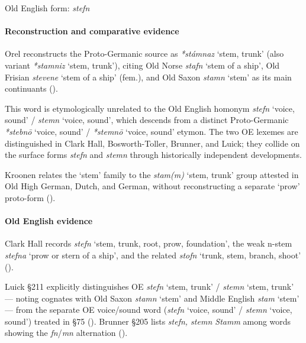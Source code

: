 \documentclass[
  british,
  a4paper,
]{article}
\providecommand{\Recon}[1]{\emph{*#1}}
\begin{document}
Old English form: \emph{stefn}

\paragraph{Reconstruction and comparative
evidence}\label{reconstruction-and-comparative-evidence-114}

Orel reconstructs the Proto-Germanic source as \Recon{stámnaz} `stem,
trunk' (also variant \Recon{stamniz} `stem, trunk'), citing Old Norse
{\emph{stafn}} `stem of a ship', Old Frisian {\emph{stevene}} `stem of a
ship' (fem.), and Old Saxon {\emph{stamn}} `stem' as its main
continuants ().

This word is etymologically unrelated to the Old English homonym
\emph{stefn} `voice, sound' / \emph{stemn} `voice, sound', which
descends from a distinct Proto-Germanic \Recon{stebnō} `voice, sound' /
\Recon{stemnō} `voice, sound' etymon. The two OE lexemes are
distinguished in Clark Hall, Bosworth-Toller, Brunner, and Luick; they
collide on the surface forms \emph{stefn} and \emph{stemn} through
historically independent developments.

Kroonen relates the `stem' family to the \emph{stam(m)} `stem, trunk'
group attested in Old High German, Dutch, and German, without
reconstructing a separate `prow' proto-form
().

\paragraph{Old English evidence}\label{old-english-evidence-116}

Clark Hall records {\emph{stefn}} `stem, trunk, root, prow, foundation',
the weak n-stem {\emph{stefna}} `prow or stern of a ship', and the
related {\emph{stofn}} `trunk, stem, branch, shoot'
().

Luick §211 explicitly distinguishes OE \emph{stefn} `stem, trunk' /
\emph{stemn} `stem, trunk' --- noting cognates with Old Saxon
{\emph{stamn}} `stem' and Middle English {\emph{stam}} `stem' --- from
the separate OE voice/sound word (\emph{stefn} `voice, sound' /
\emph{stemn} `voice, sound') treated in §75
(). Brunner §205
lists \emph{stefn, stemn Stamm} among words showing the
\emph{fn}/\emph{mn} alternation
().
\end{document}
